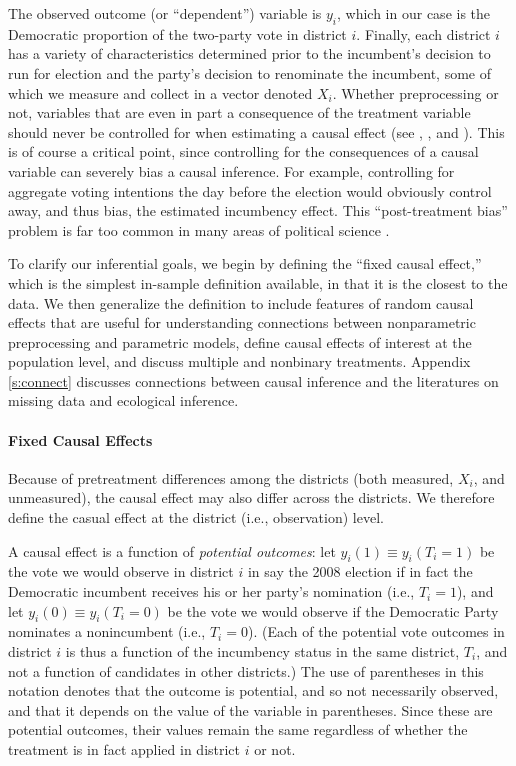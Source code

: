 \documentclass[11pt,titlepage]{article}
\begin{document}
The observed outcome (or ``dependent'') variable is $y_i$, which in
our case is the Democratic proportion of the two-party vote in
district $i$.  Finally, each district $i$ has a variety of
characteristics determined prior to the incumbent's decision to run
for election and the party's decision to renominate the incumbent,
some of which we measure and collect in a vector denoted $X_i$.
Whether preprocessing or not, variables that are even in part a
consequence of the treatment variable should never be controlled for
when estimating a causal effect (see \citealt[][Section 4.2]{Cox58},
\citealt[][]{Rosenbaum84}, and \citealt[][pp. 73--4]{Rosenbaum02}).  This is
of course a critical point, since controlling for the consequences of
a causal variable can severely bias a causal inference.  For example,
controlling for aggregate voting intentions the day before the
election would obviously control away, and thus bias, the estimated
incumbency effect.  This ``post-treatment bias'' problem is far too
common in many areas of political science \citep{KinZen06b}.

To clarify our inferential goals, we begin by defining the ``fixed
causal effect,'' which is the simplest in-sample definition available,
in that it is the closest to the data.  We then generalize the
definition to include features of random causal effects that are
useful for understanding connections between nonparametric
preprocessing and parametric models, define causal effects of interest
at the population level, and discuss multiple and nonbinary
treatments.  Appendix \ref{s:connect} discusses connections between
causal inference and the literatures on missing data and ecological
inference.

\paragraph{Fixed Causal Effects}
Because of pretreatment differences among the districts (both
measured, $X_i$, and unmeasured), the causal effect may also differ
across the districts.  We therefore define the casual effect at the
district (i.e., observation) level.

A causal effect is a function of \emph{potential outcomes}: let
$y_i(1)\equiv y_i(T_i=1)$ be the vote we would observe in district $i$
in say the 2008 election if in fact the Democratic incumbent receives
his or her party's nomination (i.e., $T_i=1$), and let $y_i(0)\equiv
y_i(T_i=0)$ be the vote we would observe if the Democratic Party
nominates a nonincumbent (i.e., $T_i=0$).  (Each of the potential vote
outcomes in district $i$ is thus a function of the incumbency status
in the same district, $T_i$, and not a function of candidates in other
districts.)  The use of parentheses in this notation denotes that the
outcome is potential, and so not necessarily observed, and that it
depends on the value of the variable in parentheses.  Since these are
potential outcomes, their values remain the same regardless of whether
the treatment is in fact applied in district $i$ or not.
\end{document}
